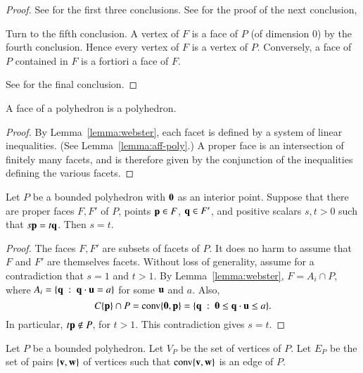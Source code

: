 \begin{proof} See \cite[Thm~3.2.1]{webster:1994} for the first three
conclusions.  See \cite[Th~2.6.5]{webster:1994} for the proof of the
next conclusion,

Turn to the fifth conclusion.  A vertex of $F$ is a face of $P$ (of
dimension $0$) by the fourth conclusion.  Hence every vertex of $F$
is a vertex of $P$.  Conversely, a face of $P$ contained in $F$ is a
fortiori a face of $F$.

See \cite[Cor~2.6.7]{webster:1994} for the final conclusion.
\end{proof}

\begin{corollary}
A face of a polyhedron is a polyhedron.  
\end{corollary}

\begin{proof} By Lemma~\ref{lemma:webster}, each facet is defined by a
system of linear inequalities.  (See Lemma~\ref{lemma:aff-poly}.)  A
proper face is an intersection of finitely many facets, and is
therefore given by the conjunction of the inequalities defining the
various facets.
\end{proof}


\begin{lemma} \label{lemma:scale} 
Let $P$ be a bounded polyhedron with ${\mathbf 0}$ as an interior point.
Suppose that there are proper faces $F,F'$ of $P$, points ${\mathbf p}\in F$,
${\mathbf q}\in F'$, and positive scalars $s,t >0$ such that $s {\mathbf p} = t {\mathbf q}$.
Then $s=t$.
\end{lemma}

\begin{proof} The faces $F,F'$ are subsets of facets of $P$.  It does
no harm to assume that $F$ and $F'$ are themselves facets.  Without
loss of generality, assume for a contradiction that $s=1$ and $t>1$.
By Lemma~\ref{lemma:webster}, $F = A_i \cap P$, where $A_i = \{{\mathbf q}
\ :\  {\mathbf q}\cdot {\mathbf u} = a\}$ for some ${\mathbf u}$ and $a$.  Also,
\begin{displaymath}
C\{{\mathbf p}\}\cap P = {\operatorname{conv}}\{{\mathbf 0},{\mathbf p}\} = \{{\mathbf q} \ :\  {\mathbf 0}\le {\mathbf q}\cdot {\mathbf u} \le a\}.
\end{displaymath}
In particular, $t {\mathbf p}\not\in P$, for $t>1$.  This contradiction gives
$s = t$.
\end{proof}





\begin{definition}[$(V_P,E_P)$] Let $P$ be a bounded polyhedron.  Let
$V_P$ be the set of vertices of $P$.  Let $E_P$ be the set of pairs
$\{{\mathbf v},{\mathbf w}\}$ of vertices such that ${\operatorname{conv}}\{{\mathbf v},{\mathbf w}\}$ is an edge of
$P$.
\end{definition}
%
%

